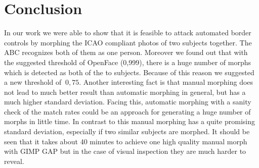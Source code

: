 \section{Conclusion}
\label{Conclusion}
In our work we were able to show that it is feasible to attack automated border controls by morphing the ICAO compliant photos of two subjects together. The ABC recognizes both of them as one person. Moreover we found out that with the suggested threshold of OpenFace (0,999), there is a huge number of morphs which is detected as both of the to subjects. Because of this reason we suggested a new threshold of $~0,75$. 
Another interesting fact is that manual morphing does not lead to much better result than automatic morphing in general, but has a much higher standard deviation. Facing this, automatic morphing with a sanity check of the match rates could be an approach for generating a huge number of morphs in little time. 
In contrast to this manual morphing has a quite promising standard deviation, especially if two similar subjects are morphed. It should be seen that it takes about 40 minutes to achieve one high quality manual morph with GIMP GAP but in the case of visual inspection they are much harder to reveal.